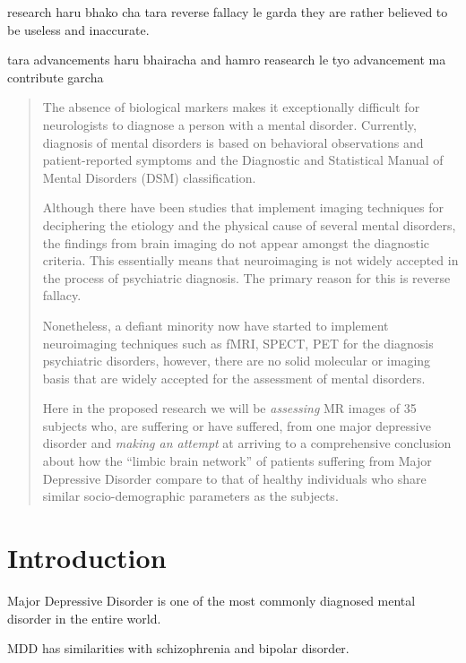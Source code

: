 \documentclass{article}
\begin{document}
    research haru bhako cha tara reverse fallacy le garda they are
    rather believed to be useless and inaccurate.

    tara advancements haru bhairacha and hamro reasearch le tyo
    advancement ma contribute garcha

  \fi

\begin{abstract}

  The absence of biological markers makes it exceptionally difficult
  for neurologists to diagnose a person with a mental disorder.
  Currently, diagnosis of mental disorders is based on behavioral
  observations and patient-reported symptoms and the Diagnostic and
  Statistical Manual of Mental Disorders (DSM) classification.

  Although there have been studies that implement imaging techniques
  for deciphering the etiology and the physical cause of several
  mental disorders, the findings from brain imaging do not appear
  amongst the diagnostic criteria. This essentially means that
  neuroimaging is not widely accepted in the process of psychiatric
  diagnosis. The primary reason for this is reverse fallacy.

  Nonetheless, a defiant minority now have started to implement
  neuroimaging techniques such as fMRI, SPECT, PET for the diagnosis
  psychiatric disorders, however, there are no solid molecular or
  imaging basis that are widely accepted for the assessment of mental
  disorders.


  Here in the proposed research we will be \textit{assessing} MR
  images of 35 subjects who, are suffering or have suffered, from one
  major depressive disorder and \textit{making an attempt} at arriving
  to a comprehensive conclusion about how the ``limbic brain network''
  of patients suffering from Major Depressive Disorder compare to that
  of healthy individuals who share similar socio-demographic
  parameters as the subjects.

\end{abstract}

\section{Introduction}

Major Depressive Disorder is one of the most commonly diagnosed mental
disorder in the entire world.

MDD has similarities with schizophrenia and bipolar disorder.
\end{document}

